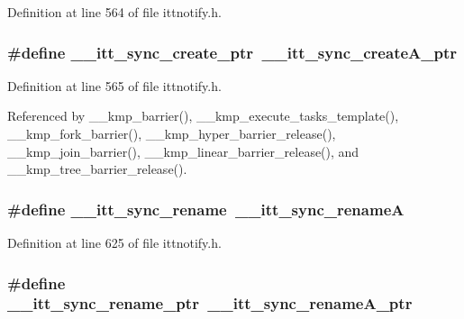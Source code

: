Definition at line 564 of file ittnotify.\-h.

\hypertarget{group__sync_gab7f1ba7abf5c98e0e0e0ea53d0e34661}{
\subsubsection[{\-\_\-\-\_\-itt\-\_\-sync\-\_\-create\-\_\-ptr}]{\setlength{\rightskip}{0pt plus 5cm}\#define \-\_\-\-\_\-itt\-\_\-sync\-\_\-create\-\_\-ptr~\-\_\-\-\_\-itt\-\_\-sync\-\_\-create\-A\-\_\-ptr}}\label{group__sync_gab7f1ba7abf5c98e0e0e0ea53d0e34661}


Definition at line 565 of file ittnotify.\-h.



Referenced by \-\_\-\-\_\-kmp\-\_\-barrier(), \-\_\-\-\_\-kmp\-\_\-execute\-\_\-tasks\-\_\-template(), \-\_\-\-\_\-kmp\-\_\-fork\-\_\-barrier(), \-\_\-\-\_\-kmp\-\_\-hyper\-\_\-barrier\-\_\-release(), \-\_\-\-\_\-kmp\-\_\-join\-\_\-barrier(), \-\_\-\-\_\-kmp\-\_\-linear\-\_\-barrier\-\_\-release(), and \-\_\-\-\_\-kmp\-\_\-tree\-\_\-barrier\-\_\-release().

\hypertarget{group__sync_gac8b1ff0b07abb7867832206f7de355ea}{
\subsubsection[{\-\_\-\-\_\-itt\-\_\-sync\-\_\-rename}]{\setlength{\rightskip}{0pt plus 5cm}\#define \-\_\-\-\_\-itt\-\_\-sync\-\_\-rename~{\bf \-\_\-\-\_\-itt\-\_\-sync\-\_\-rename\-A}}}\label{group__sync_gac8b1ff0b07abb7867832206f7de355ea}


Definition at line 625 of file ittnotify.\-h.

\hypertarget{group__sync_ga1983a053576fe0172533423524e259b0}{
\subsubsection[{\-\_\-\-\_\-itt\-\_\-sync\-\_\-rename\-\_\-ptr}]{\setlength{\rightskip}{0pt plus 5cm}\#define \-\_\-\-\_\-itt\-\_\-sync\-\_\-rename\-\_\-ptr~\-\_\-\-\_\-itt\-\_\-sync\-\_\-rename\-A\-\_\-ptr}}\label{group__sync_ga1983a053576fe0172533423524e259b0}


